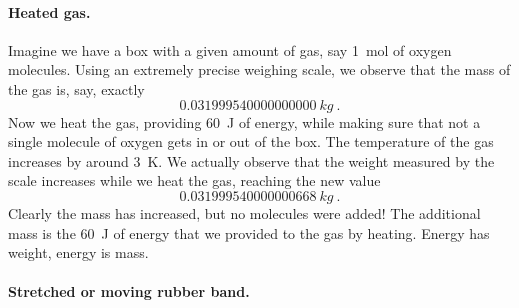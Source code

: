 \documentclass[a4paper,12pt,%
onecolumn,oneside,titlepage,%
british%
]{memoir}
\renewcommand*{\|}[1][]{\nonscript\:#1\vert\nonscript\:\mathopen{}}
\begin{document}
\paragraph{Heated gas.}

Imagine we have a box with a given amount of gas, say \qty{1}{mol} of oxygen molecules. Using an extremely precise weighing scale, we observe that the mass of the gas is, say, exactly
\begin{equation*}
  \qty{0.031999540000000000}{kg} \ .
\end{equation*}
Now we heat the gas, providing \qty{60}{J} of energy, while making sure that not a single molecule of oxygen gets in or out of the box. The temperature of the gas increases by around \qty{3}{K}. We actually observe that the weight measured by the scale increases while we heat the gas, reaching the new value
\begin{equation*}
  \qty{0.031999540000000668}{kg} \ .
\end{equation*}
Clearly the mass has increased, but no molecules were added! The additional mass is the \qty{60}{J} of energy that we provided to the gas by heating. Energy has weight, energy is mass.


\paragraph{Stretched or moving rubber band.}
\end{document}
